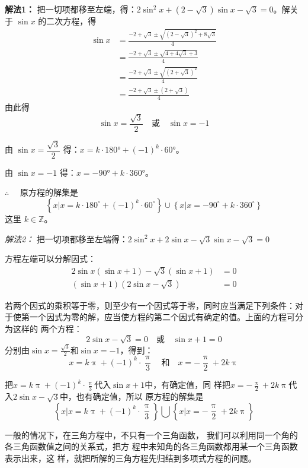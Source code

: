 \begin{solution}
\textbf{解法1：} 把一切项都移至左端，得：$2\sin^2x+\left(2-\sqrt{3}\right)\sin x-\sqrt{3}=0$。解关于 $\sin x$ 的二次方程，得
\[\begin{split}
\sin x&=\frac{-2+\sqrt{3}\pm \sqrt{\left(2-\sqrt{3}\right)^2+8\sqrt{3}}}{4}\\
&=\frac{-2+\sqrt{3}\pm \sqrt{4+4\sqrt{3}+3}}{4}\\
&=\frac{-2+\sqrt{3}\pm \sqrt{\left(2+\sqrt{3}\right)^2}}{4}\\
&=\frac{-2+\sqrt{3}\pm \left(2+\sqrt{3}\right)}{4}
\end{split}\]
由此得
\[\sin x=\frac{\sqrt{3}}{2}\quad \text{或}\quad \sin x=-1\]

由 $\sin x=\dfrac{\sqrt{3}}{2}$ 得：$x=k\cdot \ang{180}+(-1)^k\cdot \ang{60}$。

由 $\sin x=-1$ 得：$x=-\ang{90}+k\cdot \ang{360}$。

$\therefore\quad $ 原方程的解集是
\[\left\{x|x=k\cdot 180^{\circ}+(-1)^k\cdot 60^{\circ}\right\}\cup \left\{x|x=-90^{\circ}+k\cdot 360^{\circ}\right\}\]
这里 $k\in\mathbb{Z}$。

\emph{解法2：} 把一切项都移至左端得：$2\sin^2x+2\sin x-\sqrt{3}\sin x-\sqrt{3}=0$

方程左端可以分解因式：
\[\begin{split}
    2\sin x(\sin x+1)-\sqrt{3}(\sin x+1)&=0\\
    (\sin x+1)\left(2\sin x-\sqrt{3}\right)&=0
\end{split}\]

若两个因式的乘积等于零，则至少有一个因式等于零，同时应当满足下列条件：对于使第一个因式为零的解，应当使方程的第二个因式有确定的值。上面的方程可分为这样的
两个方程：
\[2\sin x-\sqrt{3}=0\quad \text{或}\quad \sin x+1=0\]
分别由$\sin x=\frac{\sqrt{3}}{2} $和$\sin x=-1$，得到：
\[x=k\uppi+(-1)^k \cdot\frac{\uppi}{3}\quad \text{和}\quad x=-\frac{\uppi}{2}+2k\uppi\]

把$x=k\uppi+(-1)^k \cdot\frac{\uppi}{3}$代入$\sin x+1$中，有确定值，同
样把$x=-\frac{\uppi}{2}+2k\uppi$代入$2\sin x-\sqrt{3}$中，也有确定值，所以
原方程的解集是
\[\left\{x\Big|x=k\uppi+(-1)^k \cdot\frac{\uppi}{3}\right\}\bigcup \left\{x\Big|x=-\frac{\uppi}{2}+2k\uppi\right\}\]
\end{solution}

一般的情况下，在三角方程中，不只有一个三角函数，
我们可以利用同一个角的各三角函数值之间的关系式，把方
程中未知角的各三角函数都用某一个三角函数表示出来，这
样，就把所解的三角方程先归结到多项式方程的问题。

